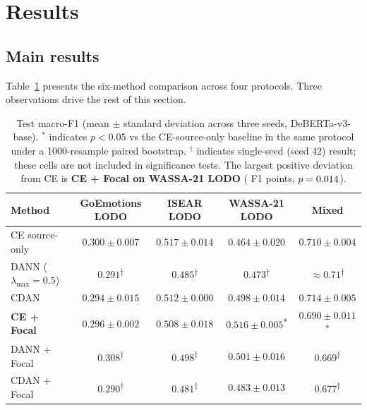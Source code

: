 \section{Results}
\label{sec:results}

\subsection{Main results}
\label{sec:results:main}

Table~\ref{tab:main} presents the six-method comparison across four
protocols. Three observations drive the rest of this section.

\begin{table}[t]
\centering
\small
\begin{tabular}{lcccc}
\toprule
\textbf{Method} & \textbf{GoEmotions LODO} & \textbf{ISEAR LODO} & \textbf{WASSA-21 LODO} & \textbf{Mixed} \\
\midrule
CE source-only         & $0.300 \pm 0.007$ & $0.517 \pm 0.014$ & $0.464 \pm 0.020$ & $0.710 \pm 0.004$ \\
DANN ($\lambda_{\max}{=}0.5$) & $0.291$\textsuperscript{$\dagger$} & $0.485$\textsuperscript{$\dagger$} & $0.473$\textsuperscript{$\dagger$} & $\approx 0.71$\textsuperscript{$\dagger$} \\
CDAN                   & $0.294 \pm 0.015$ & $0.512 \pm 0.000$ & $0.498 \pm 0.014$ & $0.714 \pm 0.005$ \\
\textbf{CE + Focal}    & $0.296 \pm 0.002$ & $0.508 \pm 0.018$ & $\mathbf{0.516 \pm 0.005}$\textsuperscript{$\ast$} & $0.690 \pm 0.011$\textsuperscript{$\ast$} \\
DANN + Focal           & $0.308$\textsuperscript{$\dagger$} & $0.498$\textsuperscript{$\dagger$} & $0.501 \pm 0.016$ & $0.669$\textsuperscript{$\dagger$} \\
CDAN + Focal           & $0.290$\textsuperscript{$\dagger$} & $0.481$\textsuperscript{$\dagger$} & $0.483 \pm 0.013$ & $0.677$\textsuperscript{$\dagger$} \\
\bottomrule
\end{tabular}
\caption{Test macro-F1 (mean $\pm$ standard deviation across three
seeds, DeBERTa-v3-base). $^\ast$ indicates $p < 0.05$ vs the
CE-source-only baseline in the same protocol under a 1000-resample
paired bootstrap. $^\dagger$ indicates single-seed (seed 42) result;
these cells are not included in significance tests. The largest
positive deviation from CE is \textbf{CE + Focal on WASSA-21 LODO}
(\focalwassagain{} F1 points, $p = 0.014$).}
\label{tab:main}
\end{table}

